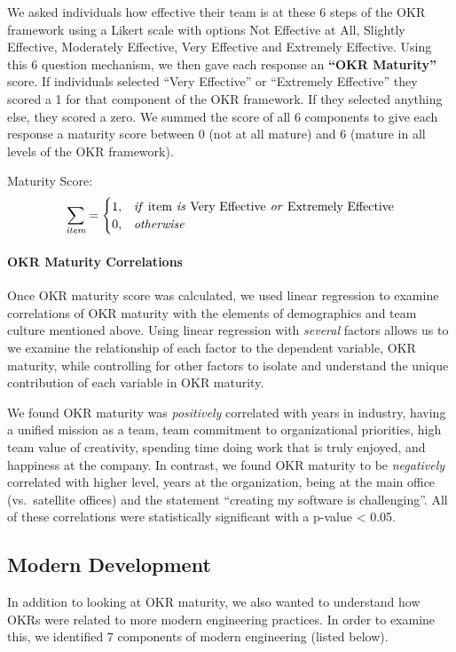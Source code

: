 \documentclass[sigconf, nonacm]{acmart}
\begin{document}
We asked individuals how effective their team is at these 6 steps of the OKR framework using a Likert scale with options Not Effective at All, Slightly Effective, Moderately Effective, Very Effective and Extremely Effective. 
Using this 6 question mechanism, we then gave each response an \textbf{``OKR Maturity''} score. If individuals selected ``Very Effective'' or ``Extremely Effective'' they scored a 1 for that component of the OKR framework. If they selected anything else, they scored a zero. We summed the score of all 6 components to give each response a maturity score between 0 (not at all mature) and 6 (mature in all levels of the OKR framework). 

\medskip
Maturity Score: 
\begin{equation}
    \sum\limits_{\textit{item}} = 
    \begin{cases}
    1, & \emph{if \emph{item} is \emph{Very Effective} or \emph{Extremely Effective}} \\
    0, & \textit{otherwise}
    \end{cases}
\end{equation}

\paragraph{OKR Maturity Correlations}
Once OKR maturity score was calculated, we used linear regression to examine correlations of OKR maturity with the elements of demographics and team culture mentioned above. Using linear regression with \emph{several} factors allows us to we examine the relationship of each factor to the dependent variable, OKR maturity, while controlling for other factors to isolate and understand the unique contribution of each variable in  OKR maturity.

We found OKR maturity was \emph{positively} correlated with years in industry, having a unified mission as a team, team commitment to organizational priorities, high team value of creativity, spending time doing work that is truly enjoyed, and happiness at the company. 
%
In contrast, we found OKR maturity to be \emph{negatively} correlated with higher level, years at the organization, being at the main office (vs.\ satellite offices) and the statement ``creating my software is challenging''. 
All of these correlations were statistically significant with a p-value < 0.05. 

\subsection{Modern Development}
In addition to looking at OKR maturity, we also wanted to understand how OKRs were related to more modern engineering practices. In order to examine this, we identified 7 components of modern engineering (listed below). 
\end{document}
